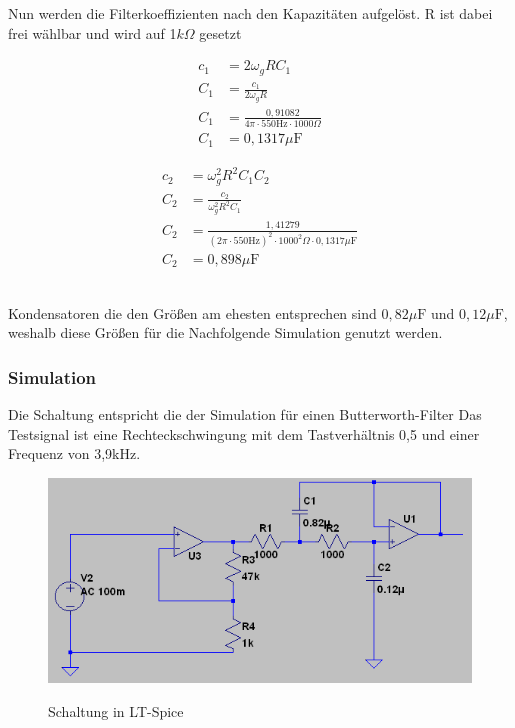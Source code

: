\documentclass[11pt,twoside,openright]{mpreport}
\begin{document}
Nun werden die Filterkoeffizienten nach den Kapazitäten aufgelöst. R ist dabei frei wählbar und wird auf 1$k\Omega$ gesetzt

\begin{minipage}{0.5\textwidth}
\begin{align*}
  c_1&= 2\omega_g R C_1\\
  C_1&=\frac{c_1}{2\omega_g R}\\
  C_1&=\frac{0,91082}{4\pi \cdot 550\text{Hz} \cdot1000\Omega}\\
  C_1&=0,1317\mu\text{F}
\end{align*}
\end{minipage}
\begin{minipage}{0.5\textwidth}
\begin{align*}
  c_2&=\omega_g^2 R^2 C_1 C_2\\
  C_2&=\frac{c_2}{\omega_g^2 R^2C_1}\\
  C_2&=\frac{1,41279}{(2\pi \cdot 550\text{Hz})^2 \cdot 1000^2\Omega \cdot 0,1317\mu\text{F}}\\
  C_2&=0,898\mu\text{F}
\end{align*}
\end{minipage}
\\

Kondensatoren die den Größen am ehesten entsprechen sind $0,82\mu\text{F}$ und $0,12\mu\text{F}$, weshalb diese Größen für die Nachfolgende Simulation genutzt werden.
\subsubsection{Simulation}
Die Schaltung entspricht die der Simulation für einen Butterworth-Filter
Das Testsignal ist eine Rechteckschwingung mit dem Tastverhältnis 0,5 und einer Frequenz von 3,9kHz.
\begin{figure}[H]
\centering
\includegraphics[width=.96\textwidth]{schaltung_ts.png}\\
\caption{Schaltung in LT-Spice}%
\label{fig:tp-schaltung_ts}
\end{figure}
\end{document}
